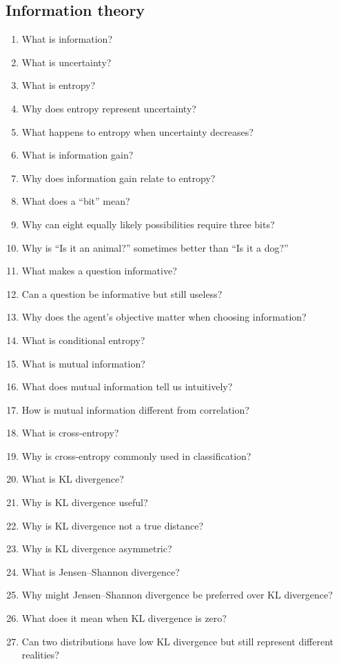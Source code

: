 \documentclass[11pt,a4paper]{article}
\begin{document}
\subsection{Information theory}
\begin{enumerate}[itemsep=1pt,start=29]
\item What is information?
\item What is uncertainty?
\item What is entropy?
\item Why does entropy represent uncertainty?
\item What happens to entropy when uncertainty decreases?
\item What is information gain?
\item Why does information gain relate to entropy?
\item What does a ``bit'' mean?
\item Why can eight equally likely possibilities require three bits?
\item Why is ``Is it an animal?'' sometimes better than ``Is it a dog?''
\item What makes a question informative?
\item Can a question be informative but still useless?
\item Why does the agent's objective matter when choosing information?
\item What is conditional entropy?
\item What is mutual information?
\item What does mutual information tell us intuitively?
\item How is mutual information different from correlation?
\item What is cross-entropy?
\item Why is cross-entropy commonly used in classification?
\item What is KL divergence?
\item Why is KL divergence useful?
\item Why is KL divergence not a true distance?
\item Why is KL divergence asymmetric?
\item What is Jensen--Shannon divergence?
\item Why might Jensen--Shannon divergence be preferred over KL divergence?
\item What does it mean when KL divergence is zero?
\item Can two distributions have low KL divergence but still represent different realities?
\end{enumerate}
\end{document}
